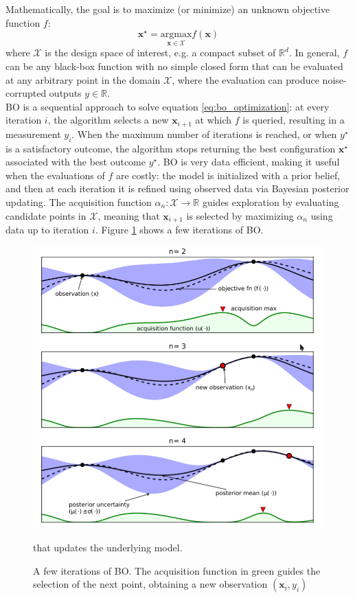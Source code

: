 \documentclass[a4paper, 12pt]{article} %
\begin{document}
	Mathematically, the goal is to maximize (or minimize) an unknown objective function $f$:\\
	\begin{equation} \label{eq:bo_optimization}
				\pmb{x}^\star = \underset{\pmb{x} \in \mathcal{X}}{\mathrm{argmax}} f(\pmb{x})
	\end{equation}
	where $\mathcal{X}$ is the design space of interest, e.g. a compact subset of $\mathbb{R}^d$. In general, $f$ can be any black-box function with no simple closed form that can be evaluated at any arbitrary point in the domain $\mathcal{X}$, where the evaluation can produce noise-corrupted outputs $y \in \mathbb{R}$.\\
	BO is a sequential approach to solve equation \ref{eq:bo_optimization}: at every iteration $i$, the algorithm selects a new $\pmb{x}_{i+1}$ at which $f$ is queried, resulting in a measurement $y_i$. When the maximum number of iterations is reached, or when $y^\star$ is a satisfactory outcome, the algorithm stops returning the best configuration $\pmb{x}^\star$ associated with the best outcome $y^\star$. BO is very data efficient, making it useful when the evaluations of $f$ are costly: the model is initialized with a prior belief, and then at each iteration it is refined using observed data via Bayesian posterior updating. The acquisition function $\alpha_n : \mathcal{X} \rightarrow \mathbb{R}$ guides exploration by evaluating candidate points in $\mathcal{X}$, meaning that $\pmb{x}_{i+1}$ is selected by maximizing $\alpha_n$ using data up to iteration $i$. Figure \ref{fig:bo} shows a few iterations of BO.
	\begin{figure} \label{fig:bo}
		\includegraphics[width=\linewidth]{img/bo.png}
		\caption{A few iterations of BO. The acquisition function in green guides the selection of the next point, obtaining a new observation $(\pmb{x}_i, y_i)$} that updates the underlying model.
	\end{figure}
\end{document}
